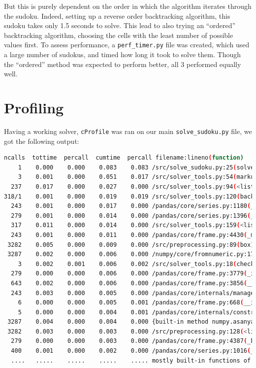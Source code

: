 \documentclass[12pt]{report} %
\begin{document}
But this is purely dependent on the order in which the algorithm iterates through the sudoku. Indeed, setting up a reverse order backtracking algorithm, this sudoku takes only 1.5 seconds to solve. This lead to also trying an ``ordered'' backtracking algorithm, choosing the cells with the least number of possible values first\cite{stackoverflow_optimizing_backtracking_sudoku}. To assess performance, a \texttt{perf\_timer.py} file was created, which used a large number of sudokus\cite{kaggle_sudoku_dataset}, and timed how long it took to solve them. Though the ``ordered'' method was expected to perform better, all 3 performed equally well.

\section{Profiling}


Having a working solver, \texttt{cProfile} was ran on our main \texttt{solve\_sudoku.py} file, we got the following output:


\begin{lstlisting}[language=Bash,caption={First profiling output}, basicstyle=\tiny]
ncalls  tottime  percall  cumtime  percall filename:lineno(function)
    1    0.000    0.000    0.083    0.083 /src/solve_sudoku.py:25(solve_sudoku
    3    0.001    0.000    0.051    0.017 /src/solver_tools.py:54(markup)
  237    0.017    0.000    0.027    0.000 /src/solver_tools.py:94(<listcomp>)
318/1    0.001    0.000    0.019    0.019 /src/solver_tools.py:120(backtrack_alg)
  243    0.001    0.000    0.017    0.000 /pandas/core/series.py:1180(__setitem__)
  279    0.001    0.000    0.014    0.000 /pandas/core/series.py:1396(_maybe_update_cacher)
  317    0.011    0.000    0.014    0.000 /src/solver_tools.py:159(<listcomp>)
  243    0.001    0.000    0.011    0.000 /pandas/core/frame.py:4430(_maybe_cache_changed)
 3282    0.005    0.000    0.009    0.000 /src/preprocessing.py:89(box)
 3287    0.002    0.000    0.006    0.000 /numpy/core/fromnumeric.py:1768(ravel)
    3    0.002    0.001    0.006    0.002 /src/solver_tools.py:18(check_sudoku)
  279    0.000    0.000    0.006    0.000 /pandas/core/frame.py:3779(_ixs)
  643    0.002    0.000    0.006    0.000 /pandas/core/frame.py:3856(__getitem__)
  243    0.003    0.000    0.005    0.000 /pandas/core/internals/managers.py:1045(iset)
    6    0.000    0.000    0.005    0.001 /pandas/core/frame.py:668(__init__)
    5    0.000    0.000    0.004    0.001 /pandas/core/internals/construction.py:423(dict_to_mgr)
 3287    0.004    0.000    0.004    0.000 {built-in method numpy.asanyarray}
 3282    0.003    0.000    0.003    0.000 /src/preprocessing.py:128(<listcomp>)
  279    0.000    0.000    0.003    0.000 /pandas/core/frame.py:4387(_box_col_values)
  400    0.001    0.000    0.002    0.000 /pandas/core/series.py:1016(__getitem__)
  ....   .....    .....    .....    ..... mostly built-in functions of packages
\end{lstlisting}
\end{document}
